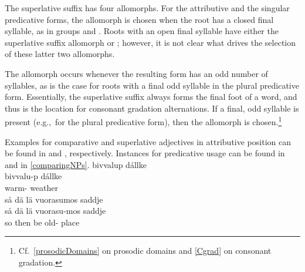 The superlative suffix has four allomorphs. For the attributive and the singular predicative forms, the allomorph  is chosen when the root has a closed final syllable, as in groups  and . Roots with an open final syllable have either the superlative suffix allomorph  or ; however, it is not clear what drives the selection of these latter two allomorphs. 

The allomorph  occurs whenever the resulting form has an odd number of syllables, as is the case for roots with a final odd syllable in the plural predicative form. %
Essentially, the superlative suffix always forms the final foot of a word, and thus is the location for consonant gradation alternations. If a final, odd syllable is present (e.g.,~for the plural predicative form), then the \mbox{} allomorph is chosen.\footnote{Cf.~\SEC\ref{prosodicDomains} on prosodic domains and \SEC\ref{Cgrad} on consonant gradation.} 

Examples for comparative and superlative adjectives in attributive position can be found in  and , respectively. Instances for predicative usage can be found in  and  in \SEC\ref{comparingNPs}.
\ea\label{compATTRADJex1}
\glll	bivvalup dállke\\
	bivvalu-p dállke\\
	warm- weather\BS{}\\
{}	
\z
\ea\label{superlATTRADJex1}%
\glll	så dä lä vuorasumos saddje\\
	så dä lä vuorasu-mos saddje\\
	so then be\BS{} old- place\BS{}\\
{}	
\z


